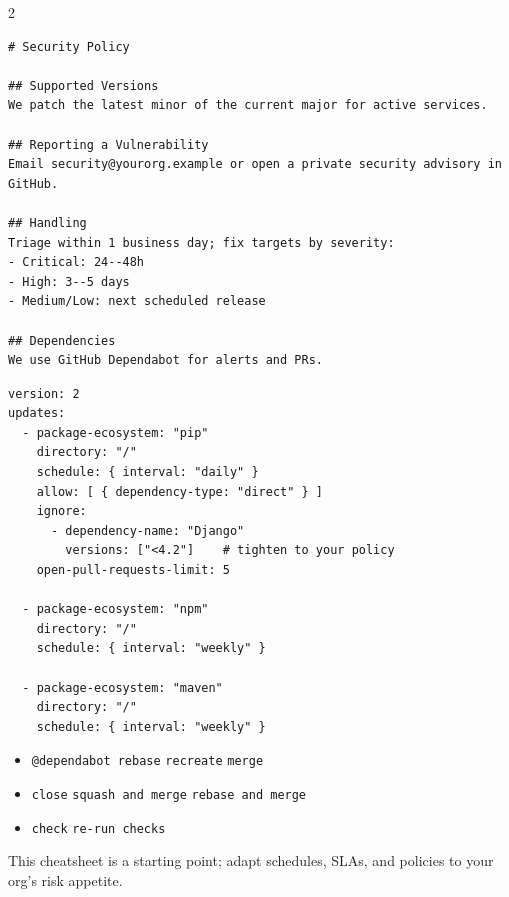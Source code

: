 \documentclass[11pt,letterpaper]{article}
\begin{document}
\begin{multicols}{2}
\begin{tcolorbox}[title=\bfseries SECURITY.md (Starter)]
\begin{verbatim}
# Security Policy

## Supported Versions
We patch the latest minor of the current major for active services.

## Reporting a Vulnerability
Email security@yourorg.example or open a private security advisory in GitHub.

## Handling
Triage within 1 business day; fix targets by severity:
- Critical: 24--48h
- High: 3--5 days
- Medium/Low: next scheduled release

## Dependencies
We use GitHub Dependabot for alerts and PRs.
\end{verbatim}
\end{tcolorbox}

\begin{tcolorbox}[title=\bfseries \texttt{.github/dependabot.yml} (Copy-Ready)]
\begin{verbatim}
version: 2
updates:
  - package-ecosystem: "pip"
    directory: "/"
    schedule: { interval: "daily" }
    allow: [ { dependency-type: "direct" } ]
    ignore:
      - dependency-name: "Django"
        versions: ["<4.2"]    # tighten to your policy
    open-pull-requests-limit: 5

  - package-ecosystem: "npm"
    directory: "/"
    schedule: { interval: "weekly" }

  - package-ecosystem: "maven"
    directory: "/"
    schedule: { interval: "weekly" }
\end{verbatim}
\end{tcolorbox}

\begin{tcolorbox}[title=\bfseries Handy \texttt{@dependabot} PR Commands]
\begin{itemize}
  \item \texttt{@dependabot rebase} \quad \texttt{recreate} \quad \texttt{merge}
  \item \texttt{close} \quad \texttt{squash and merge} \quad \texttt{rebase and merge}
  \item \texttt{check} \quad \texttt{re-run checks}
\end{itemize}
\end{tcolorbox}

\end{multicols}

\vfill
\begin{center}
{\footnotesize This cheatsheet is a starting point; adapt schedules, SLAs, and policies to your org's risk appetite.}
\end{center}
\end{document}
